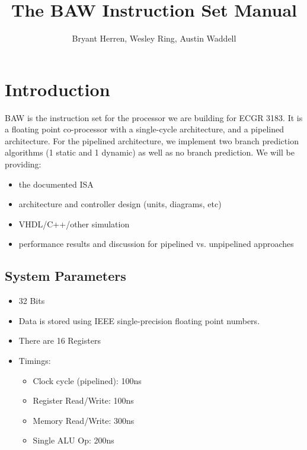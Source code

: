 \documentclass[a4paper,14pt]{article}
\title{The BAW Instruction Set Manual}
\author{Bryant Herren, Wesley Ring, Austin Waddell}
\date{}
\begin{document}
\newcommand\DescEntry[1]{%
  \multirow{1}*{%
    \begin{varwidth}{13em}%
    \flushright #1%
    \end{varwidth}}}

\newcommand\Tstrut{\rule{0pt}{2.6ex}}       %
\newcommand\Bstrut{\rule[-0.9ex]{0pt}{0pt}} %
\newcommand{\TBstrut}{\Tstrut\Bstrut} %
    
\null  %
\nointerlineskip  %
\vfill
\let\snewpage \newpage
\let\newpage \relax
\maketitle
\let \newpage \snewpage
\vfill 
\newpage

{\hypersetup{linktoc=all,hidelinks}
\tableofcontents
}
\newpage

\section{Introduction}
BAW is the instruction set for the processor we are building for ECGR 3183. It is a floating point co-processor with a single-cycle architecture, and a pipelined architecture. For the pipelined architecture, we implement two branch prediction algorithms (1 static and 1 dynamic) as well as no branch prediction.
\newline\newline
We will be providing:
\begin{itemize}
    \setlength{\parskip}{0pt}
    \setlength{\itemsep}{0pt plus 1pt}
    \item the documented ISA
    \item architecture and controller design (units, diagrams, etc)
    \item VHDL/C++/other simulation
    \item performance results and discussion for pipelined vs. unpipelined approaches
\end{itemize}


\subsection{System Parameters}
\begin{itemize}
    \setlength{\parskip}{0pt}
    \setlength{\itemsep}{0pt plus 1pt}
    \item 32 Bits
    \item Data is stored using IEEE single-precision floating point numbers.
    \item There are 16 Registers
    \item Timings:
    \begin{itemize}
        \setlength{\parskip}{0pt}
        \item Clock cycle (pipelined): 100ns
        \item Register Read/Write: 100ns
        \item Memory Read/Write: 300ns
        \item Single ALU Op: 200ns
    \end{itemize}
\end{itemize}
\end{document}
